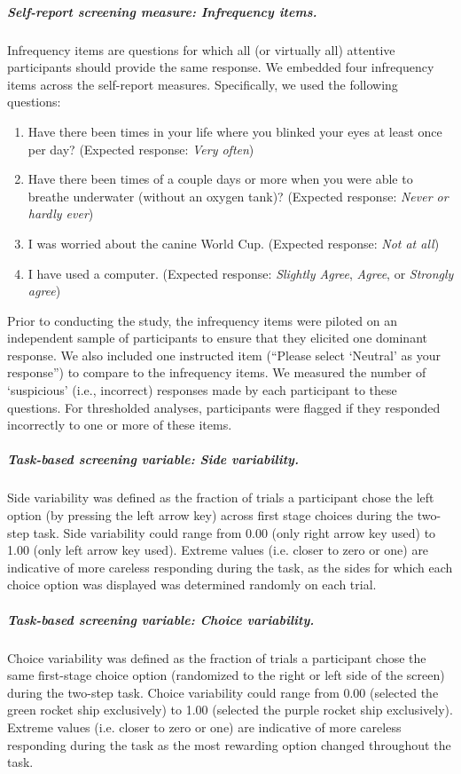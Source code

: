 \documentclass[a4paper,notitlepage,12pt]{article}
\begin{document}
\begin{refsection}[supp]
\subparagraph{Self-report screening measure: Infrequency items.} Infrequency items are questions for which all (or virtually all) attentive participants should provide the same response. We embedded four infrequency items across the self-report measures. Specifically, we used the following questions:

\begin{enumerate}
  \item Have there been times in your life where you blinked your eyes at least once per day? (Expected response: \textit{Very often})
  \item Have there been times of a couple days or more when you were able to breathe underwater (without an oxygen tank)? (Expected response: \textit{Never or hardly ever})
  \item I was worried about the canine World Cup. (Expected response: \textit{Not at all})
  \item I have used a computer. (Expected response: \textit{Slightly Agree}, \textit{Agree}, or \textit{Strongly agree})
\end{enumerate}

Prior to conducting the study, the infrequency items were piloted on an independent sample of participants to ensure that they elicited one dominant response. We also included one instructed item (``Please select `Neutral' as your response'') to compare to the infrequency items. We measured the number of `suspicious' (i.e., incorrect) responses made by each participant to these questions. For thresholded analyses, participants were flagged if they responded incorrectly to one or more of these items. 

\subparagraph{Task-based screening variable: Side variability.} Side variability was defined as the fraction of trials a participant chose the left option (by pressing the left arrow key) across first stage choices during the two-step task. Side variability could range from 0.00 (only right arrow key used) to 1.00 (only left arrow key used). Extreme values (i.e. closer to zero or one) are indicative of more careless responding during the task, as the sides for which each choice option was displayed was determined randomly on each trial.  

\subparagraph{Task-based screening variable: Choice variability.} Choice variability was defined as the fraction of trials a participant chose the same first-stage choice option (randomized to the right or left side of the screen) during the two-step task. Choice variability could range from 0.00 (selected the green rocket ship exclusively) to 1.00 (selected the purple rocket ship exclusively). Extreme values (i.e. closer to zero or one) are indicative of more careless responding during the task as the most rewarding option changed throughout the task.  


\end{refsection}
\end{document}
